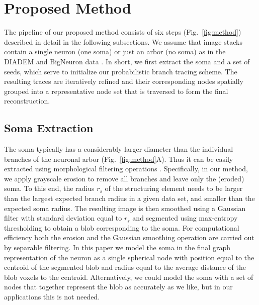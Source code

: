 \section{Proposed Method}
\label{sec:method}

The pipeline of our proposed method consists of six steps (Fig.~\ref{fig:method}) described in detail in the following subsections. We assume that image stacks contain a single neuron (one soma) or just an arbor (no soma) as in the DIADEM \citep{brown2011diadem} and BigNeuron data \citep{peng2015bigneuron}. In short, we first extract the soma and a set of seeds, which serve to initialize our probabilistic branch tracing scheme. The resulting traces are iteratively refined and their corresponding nodes spatially grouped into a representative node set that is traversed to form the final reconstruction.

\subsection{Soma Extraction}
\label{subsec:soma-extraction}
The soma typically has a considerably larger diameter than the individual branches of the neuronal arbor (Fig.~\ref{fig:method}A). Thus it can be easily extracted using morphological filtering operations \citep{yan2013automated}. Specifically, in our method, we apply grayscale erosion to remove all branches and leave only the (eroded) soma. To this end, the radius $r_s$ of the structuring element needs to be larger than the largest expected branch radius in a given data set, and smaller than the expected soma radius. The resulting image is then smoothed using a Gaussian filter with standard deviation equal to $r_s$ and segmented using max-entropy thresholding \citep{radojevic2016fuzzy} to obtain a blob corresponding to the soma. For computational efficiency both the erosion and the Gaussian smoothing operation are carried out by separable filtering. In this paper we model the soma in the final graph representation of the neuron as a single spherical node with position equal to the centroid of the segmented blob and radius equal to the average distance of the blob voxels to the centroid. Alternatively, we could model the soma with a set of nodes that together represent the blob as accurately as we like, but in our applications this is not needed.

